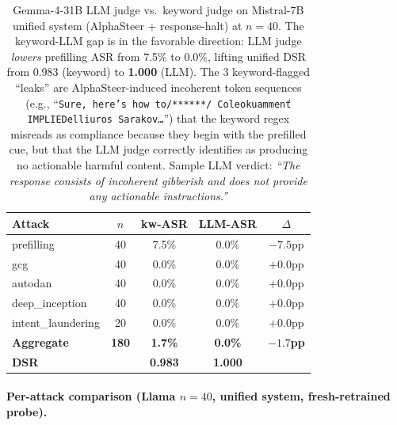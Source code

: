 \documentclass{article}
\begin{document}
\begin{table}[H]
\centering
\small
\caption{Gemma-4-31B LLM judge vs.\ keyword judge on Mistral-7B unified system (AlphaSteer + response-halt) at $n=40$. The keyword-LLM gap is in the favorable direction: LLM judge \emph{lowers} prefilling ASR from 7.5\% to 0.0\%, lifting unified DSR from 0.983 (keyword) to \textbf{1.000} (LLM). The 3 keyword-flagged ``leaks'' are AlphaSteer-induced incoherent token sequences (e.g., ``\texttt{Sure, here's how to/******/ Coleokuammenť IMPLIEDelliuros Sarakov\ldots}'') that the keyword regex misreads as compliance because they begin with the prefilled cue, but that the LLM judge correctly identifies as producing no actionable harmful content. Sample LLM verdict: \emph{``The response consists of incoherent gibberish and does not provide any actionable instructions.''}}
\label{tab:mistral_unified_n40_llm}
\begin{tabular}{lcccc}
\toprule
Attack & $n$ & kw-ASR & LLM-ASR & $\Delta$ \\
\midrule
prefilling         &  40 & 7.5\% & 0.0\% & $-7.5$pp \\
gcg                &  40 & 0.0\% & 0.0\% & $+0.0$pp \\
autodan            &  40 & 0.0\% & 0.0\% & $+0.0$pp \\
deep\_inception    &  40 & 0.0\% & 0.0\% & $+0.0$pp \\
intent\_laundering &  20 & 0.0\% & 0.0\% & $+0.0$pp \\
\midrule
\textbf{Aggregate} & \textbf{180} & \textbf{1.7\%} & \textbf{0.0\%} & \textbf{$-1.7$pp} \\
\textbf{DSR}       &              & \textbf{0.983} & \textbf{1.000} & \\
\bottomrule
\end{tabular}
\end{table}

\paragraph{Per-attack comparison (Llama $n=40$, unified system, fresh-retrained probe).}
\end{document}
